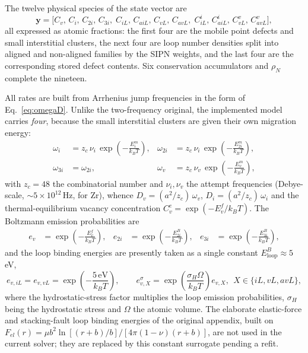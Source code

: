 \documentclass{article}
\begin{document}
The twelve physical species of the state vector are
\begin{equation}
\mathbf{y} = \bigl[C_v,\,C_i,\,C_{2i},\,C_{3i},\;
C_{iL},\,C_{aiL},\,C_{vL},\,C_{avL},\;
C_{iL}^{i},\,C_{aiL}^{i},\,C_{vL}^{v},\,C_{avL}^{v}\bigr],
\label{eq:zrmicro_state}
\end{equation}
all expressed as atomic fractions: the first four are the mobile point defects and
small interstitial clusters, the next four are loop number densities split into
aligned and non-aligned families by the SIPN weights, and the last four are the
corresponding stored defect contents. Six conservation accumulators and $\rho_N$
complete the nineteen.

All rates are built from Arrhenius jump frequencies in the form of
Eq.~\eqref{eq:omegaD}. Unlike the two-frequency original, the implemented model
carries \emph{four}, because the small interstitial clusters are given their own
migration energy:
\begin{align}
\omega_i   &= z_c\,\nu_i\,\exp\!\left(-\frac{E_i^m}{k_BT}\right), &
\omega_{2i}&= z_c\,\nu_i\,\exp\!\left(-\frac{E_{2i}^m}{k_BT}\right), \\
\omega_{3i}&= \omega_{2i}, &
\omega_v   &= z_c\,\nu_v\,\exp\!\left(-\frac{E_v^m}{k_BT}\right),
\label{eq:freqs}
\end{align}
with $z_c=48$ the combinatorial number and $\nu_i,\nu_v$ the attempt frequencies
(Debye-scale, $\sim\!5\times10^{12}\,$Hz, for Zr), whence
$D_v=(a^2/z_c)\,\omega_v$, $D_i=(a^2/z_c)\,\omega_i$ and the thermal-equilibrium
vacancy concentration $C_v^e=\exp(-E_v^f/k_BT)$. The Boltzmann emission
probabilities are
\begin{align}
e_v   &= \exp\!\left(-\frac{E_v^f}{k_BT}\right), &
e_{2i}&= \exp\!\left(-\frac{E_{2i}^B}{k_BT}\right), &
e_{3i}&= \exp\!\left(-\frac{E_{3i}^B}{k_BT}\right),
\label{eq:emit}
\end{align}
and the loop binding energies are presently taken as a single constant
$E^B_{\mathrm{loop}}\approx 5\,$eV,
\begin{equation}
e_{v,iL}=e_{v,vL}=\exp\!\left(-\frac{5\,\mathrm{eV}}{k_BT}\right),
\qquad
e^{\sigma}_{v,X}=\exp\!\left(\frac{\sigma_H\Omega}{k_BT}\right)e_{v,X},
\ \ X\in\{iL,vL,avL\},
\label{eq:loopemit}
\end{equation}
where the hydrostatic-stress factor multiplies the loop emission probabilities,
$\sigma_H$ being the hydrostatic stress and $\Omega$ the atomic volume. The
elaborate elastic-force and stacking-fault loop binding energies of the original
appendix, built on $F_{el}(r)=\mu b^2\ln[(r+b)/b]/[4\pi(1-\nu)(r+b)]$, are not
used in the current solver; they are replaced by this constant surrogate pending a
refit.
\end{document}
